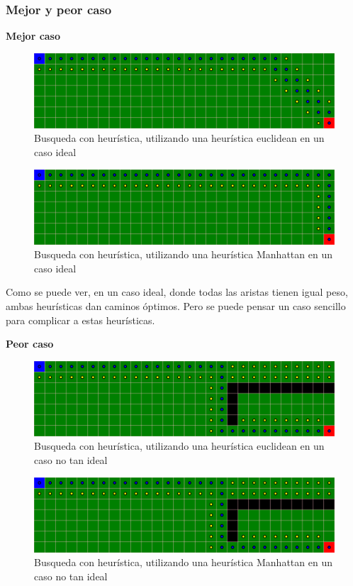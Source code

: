 \subsubsection{Mejor y peor caso}
\textbf{Mejor caso}
\begin{figure}[H]
\centering
\includegraphics[width=\textwidth]{BestSearch/grafo2Euclidean.png}
\caption{Busqueda con heurística, utilizando una heurística euclidean en un caso ideal}
\end{figure}
\begin{figure}[H]
\centering
\includegraphics[width=\textwidth]{BestSearch/grafo2Manhattan.png}
\caption{Busqueda con heurística, utilizando una heurística Manhattan en un caso ideal}
\end{figure}

Como se puede ver, en un caso ideal, donde todas las aristas tienen igual peso, ambas heurísticas dan caminos óptimos. Pero se puede pensar un caso sencillo para complicar a estas heurísticas.

\textbf{Peor caso}
\begin{figure}[H]
\centering
\includegraphics[width=\textwidth]{BestSearch/grafo3Euclidean.png}
\caption{Busqueda con heurística, utilizando una heurística euclidean en un caso no tan ideal}
\end{figure}
\begin{figure}[H]
\centering
\includegraphics[width=\textwidth]{BestSearch/grafo3Manhattan.png}
\caption{Busqueda con heurística, utilizando una heurística Manhattan en un caso no tan ideal}
\end{figure}

